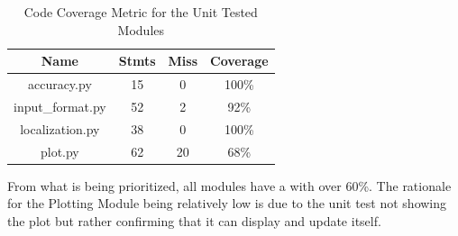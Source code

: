 \documentclass[12pt, titlepage]{article}
\begin{document}
\begin{table}[H]
  \begin{center}
  \begin{tabular}{ |c|c|c|c| }
  \hline
   \textbf{Name} &  \textbf{Stmts} &  \textbf{Miss} &  \textbf{Coverage}\\ 
  \hline
  
      accuracy.py & 15 & 0 & 100\% \\ 
      \hline
      input\_format.py & 52 & 2 & 92\% \\
      \hline
      localization.py & 38 & 0 & 100\% \\ 
      \hline
      plot.py & 62 & 20 & 68\% \\
  \hline
  \end{tabular}
  \caption{Code Coverage Metric for the Unit Tested Modules}
\label{tab:code-coverage-metrics}
\end{center}
\end{table}

From what is being prioritized, all modules have a with over 60\%. The rationale for the Plotting Module being relatively low is due to the unit test not showing the plot but rather confirming that it can display and update itself.


\newpage


\end{document}
